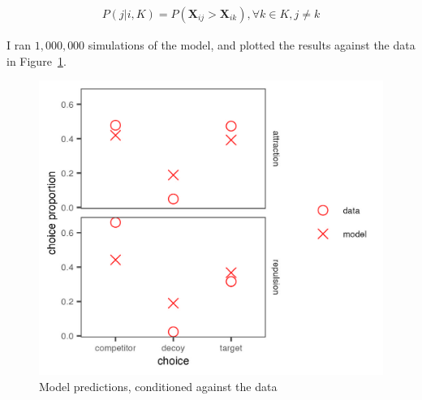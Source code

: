 \begin{align}
   P(j|i,K)=P(\mathbf{X}_{ij}>\mathbf{X}_{ik}), \forall k \in K, j \neq k
   \label{eqn:pchoice_price}
\end{align}

I ran $1,000,000$ simulations of the model, and plotted the results against the data in Figure~\ref{fig:bayes_choice_sim_preds}.

\begin{figure}
    \includegraphics{figures/bayes_choice_sim_preds.jpeg}
    \caption{Model predictions, conditioned against the data}
    \label{fig:bayes_choice_sim_preds}
\end{figure}